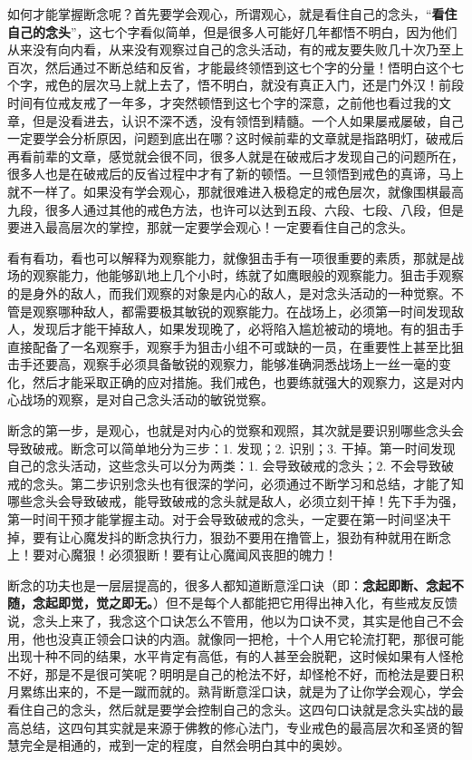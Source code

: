 如何才能掌握断念呢？首先要学会观心，所谓观心，就是看住自己的念头，“\textbf{看住自己的念头}”，这七个字看似简单，但是很多人可能好几年都悟不明白，因为他们从来没有向内看，从来没有观察过自己的念头活动，有的戒友要失败几十次乃至上百次，然后通过不断总结和反省，才能最终领悟到这七个字的分量！悟明白这个七个字，戒色的层次马上就上去了，悟不明白，就没有真正入门，还是门外汉！前段时间有位戒友戒了一年多，才突然顿悟到这七个字的深意，之前他也看过我的文章，但是没看进去，认识不深不透，没有领悟到精髓。一个人如果屡戒屡破，自己一定要学会分析原因，问题到底出在哪？这时候前辈的文章就是指路明灯，破戒后再看前辈的文章，感觉就会很不同，很多人就是在破戒后才发现自己的问题所在，很多人也是在破戒后的反省过程中才有了新的顿悟。一旦领悟到戒色的真谛，马上就不一样了。如果没有学会观心，那就很难进入极稳定的戒色层次，就像围棋最高九段，很多人通过其他的戒色方法，也许可以达到五段、六段、七段、八段，但是要进入最高层次的掌控，那就一定要学会观心！一定要看住自己的念头。

看有看功，看也可以解释为观察能力，就像狙击手有一项很重要的素质，那就是战场的观察能力，他能够趴地上几个小时，练就了如鹰眼般的观察能力。狙击手观察的是身外的敌人，而我们观察的对象是内心的敌人，是对念头活动的一种觉察。不管是观察哪种敌人，都需要极其敏锐的观察能力。在战场上，必须第一时间发现敌人，发现后才能干掉敌人，如果发现晚了，必将陷入尴尬被动的境地。有的狙击手直接配备了一名观察手，观察手为狙击小组不可或缺的一员，在重要性上甚至比狙击手还要高，观察手必须具备敏锐的观察力，能够准确洞悉战场上一丝一毫的变化，然后才能采取正确的应对措施。我们戒色，也要练就强大的观察力，这是对内心战场的观察，是对自己念头活动的敏锐觉察。

断念的第一步，是观心，也就是对内心的觉察和观照，其次就是要识别哪些念头会导致破戒。断念可以简单地分为三步：1. 发现；2. 识别；3. 干掉。第一时间发现自己的念头活动，这些念头可以分为两类：1. 会导致破戒的念头；2. 不会导致破戒的念头。第二步识别念头也有很深的学问，必须通过不断学习和总结，才能了知哪些念头会导致破戒，能导致破戒的念头就是敌人，必须立刻干掉！先下手为强，第一时间干预才能掌握主动。对于会导致破戒的念头，一定要在第一时间坚决干掉，要有让心魔发抖的断念执行力，狠劲不要用在撸管上，狠劲有种就用在断念上！要对心魔狠！必须狠断！要有让心魔闻风丧胆的魄力！

断念的功夫也是一层层提高的，很多人都知道断意淫口诀（即：\textbf{念起即断、念起不随，念起即觉，觉之即无。}）但不是每个人都能把它用得出神入化，有些戒友反馈说，念头上来了，我念这个口诀怎么不管用，他以为口诀不灵，其实是他自己不会用，他也没真正领会口诀的内涵。就像同一把枪，十个人用它轮流打靶，那很可能出现十种不同的结果，水平肯定有高低，有的人甚至会脱靶，这时候如果有人怪枪不好，那是不是很可笑呢？明明是自己的枪法不好，却怪枪不好，而枪法是要日积月累练出来的，不是一蹴而就的。熟背断意淫口诀，就是为了让你学会观心，学会看住自己的念头，然后就是要学会控制自己的念头。这四句口诀就是念头实战的最高总结，这四句其实就是来源于佛教的修心法门，专业戒色的最高层次和圣贤的智慧完全是相通的，戒到一定的程度，自然会明白其中的奥妙。

